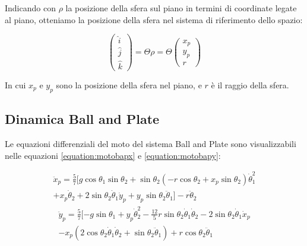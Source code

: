 Indicando con $\rho$ la posizione della sfera sul piano in termini di coordinate legate al piano, otteniamo la posizione della sfera nel sistema di riferimento dello spazio:

\begin{equation}
	\begin{pmatrix}
		\hat{i}	\\
		\hat{j} \\
		\hat{k}
	\end{pmatrix}=
		\Theta\rho=
		\Theta
		\begin{pmatrix}
			x_{p}\\
			y_{p}\\
			r
		\end{pmatrix}
	\label{equation:rho}
\end{equation}

In cui $x_{p}$ e $y_{p}$ sono la posizione della sfera nel piano, e $r$ è il raggio della sfera.


\subsection{Dinamica Ball and Plate}

Le equazioni differenziali del moto del sistema Ball and Plate sono visualizzabili nelle equazioni \ref{equation:motobapx} e \ref{equation:motobapy}:

\begin{equation}
	\begin{split}
		\ddot{x}_{p}=\frac{5}{7}[g\cos\theta_{1}\sin\theta_{2}+\sin\theta_{2}(-r\cos\theta_{2}+x_{p}\sin\theta_{2})\dot{\theta}_{1}^2	\\
			+x_{p}\dot{\theta}_{2}+2\sin\theta_{2}\dot{\theta}_{1}\dot{y}_{p}+y_{p}\sin\theta_{2}\ddot{\theta}_{1}]-r\ddot{\theta}_{2}
	\end{split}
	\label{equation:motobapx}
\end{equation}
\begin{equation}
	\begin{split}
		\ddot{y}_{p}=\frac{5}{7}[-g\sin\theta_{1}+y_{p}\dot{\theta}_{2}^2-\frac{12}{5}r\sin\theta_{2}\dot{\theta}_{1}\dot{\theta}_{2}-2\sin\theta_{2}\dot{\theta}_{1}\dot{x}_{p}	\\
		-x_{p}(2\cos\theta_{2}\dot{\theta}_{1}\dot{\theta}_{2}+\sin\theta_{2}\ddot{\theta}_{1})+r\cos\theta_{2}\ddot{\theta}_{1}
	\end{split}
	\label{equation:motobapy}
\end{equation}

